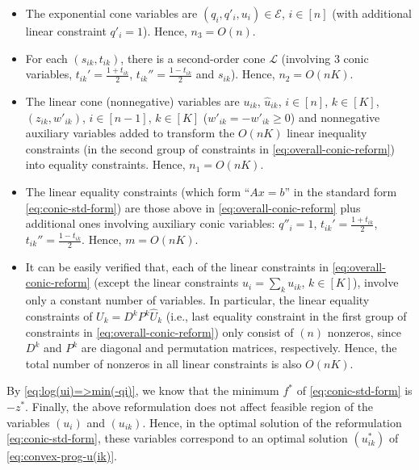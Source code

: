 \begin{itemize}
	\item The exponential cone variables are $(q_i, q'_i, u_i)\in \mathcal{E}$, $i\in [n]$ (with additional linear constraint $q'_i = 1$). Hence, $n_3 = O(n)$.
	\item For each $(s_{ik}, t_{ik})$, there is a second-order cone $\mathcal{L}$ (involving $3$ conic variables, $t_{ik}' = \frac{1+t_{ik}}{2}$, $t_{ik}'' = \frac{1-t_{ik}}{2}$ and $s_{ik}$). Hence, $n_2 = O(nK)$.
	\item The linear cone (nonnegative) variables are $u_{ik}$, $\hat{u}_{ik}$, $i\in [n]$, $k\in [K]$, $(z_{ik}, w'_{ik})$, $i\in [n-1]$, $k\in [K]$ ($w'_{ik} = -w'_{ik}\geq 0$) and nonnegative auxiliary variables added to transform the $O(nK)$ linear inequality constraints (in the second group of constraints in \eqref{eq:overall-conic-reform}) into equality constraints. Hence, $n_1 = O(nK)$.
	\item The linear equality constraints (which form ``$Ax=b$'' in the standard form \eqref{eq:conic-std-form}) are those above in \eqref{eq:overall-conic-reform} plus additional ones involving auxiliary conic variables: $q''_i = 1$, $t_{ik}' = \frac{1+t_{ik}}{2}$, $t_{ik}'' = \frac{1-t_{ik}}{2}$. Hence, $m = O(nK)$. 
	\item It can be easily verified that, each of the linear constraints in \eqref{eq:overall-conic-reform} (except the linear constraints $u_i = \sum_{k} u_{ik}$, $k\in[K]$), involve only a constant number of variables. 
	In particular, the linear equality constraints of $U_k = D^k P^k \hat{U}_k$ (i.e., last equality constraint in the first group of constraints in \eqref{eq:overall-conic-reform}) only consist of $(n)$ nonzeros, since $D^k$ and $P^k$ are diagonal and permutation matrices, respectively. 
	Hence, the total number of nonzeros in all linear constraints is also $O(nK)$.
\end{itemize} 
By \eqref{eq:log(ui)=>min(-qi)}, we know that the minimum $f^*$ of \eqref{eq:conic-std-form} is $-z^*$. Finally, the above reformulation does not affect feasible region of the variables $(u_i)$ and $(u_{ik})$.
Hence, in the optimal solution of the reformulation \eqref{eq:conic-std-form}, these variables correspond to an optimal solution $(u^*_{ik})$ of \eqref{eq:convex-prog-u(ik)}.

